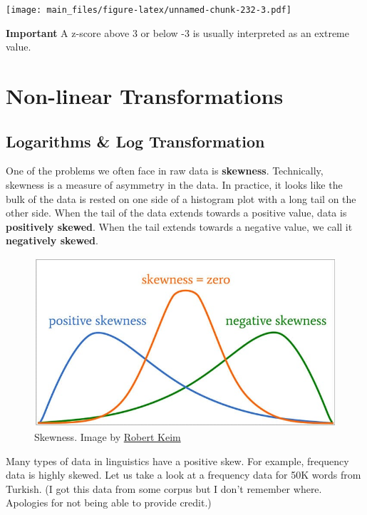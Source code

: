 \documentclass[
]{book}
\begin{document}
\texttt{[image: main\_files/figure-latex/unnamed-chunk-232-3.pdf]}

\textbf{Important} A z-score above 3 or below -3 is usually interpreted as an extreme value.

\section{Non-linear Transformations}\label{non-linear-transformations}

\subsection{Logarithms \& Log Transformation}\label{logarithms-log-transformation}

One of the problems we often face in raw data is \textbf{skewness}. Technically, skewness is a measure of asymmetry in the data. In practice, it looks like the bulk of the data is rested on one side of a histogram plot with a long tail on the other side. When the tail of the data extends towards a positive value, data is \textbf{positively skewed}. When the tail extends towards a negative value, we call it \textbf{negatively skewed}.

\begin{figure}
\centering
\includegraphics{./img/skewness.jpg}
\caption{\label{fig:skewness}Skewness. Image by \href{https://www.allaboutcircuits.com/technical-articles/understanding-the-normal-distribution-parametric-tests-skewness-and-kurtosis/}{Robert Keim}}
\end{figure}

Many types of data in linguistics have a positive skew. For example, frequency data is highly skewed. Let us take a look at a frequency data for 50K words from Turkish. (I got this data from some corpus but I don't remember where. Apologies for not being able to provide credit.)
\end{document}
